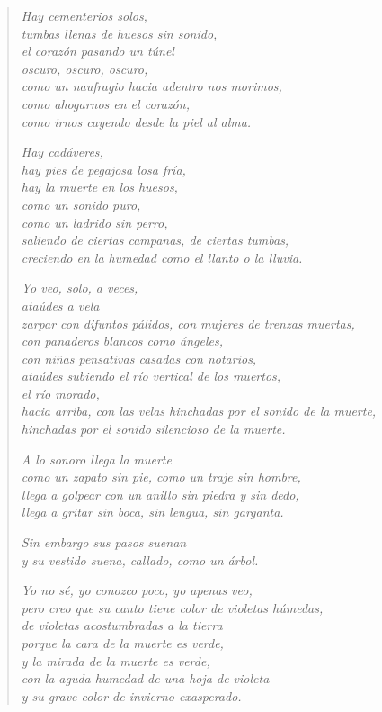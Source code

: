\documentclass[12pt]{article}
\begin{document}
\clearpage
{}
\begin{verse}

\emph{Hay cementerios solos,\\
tumbas llenas de huesos sin sonido,\\
el corazón pasando un túnel\\
oscuro, oscuro, oscuro,\\
como un naufragio hacia adentro nos morimos,\\
como ahogarnos en el corazón,\\
como irnos cayendo desde la piel al alma.}  

\emph{Hay cadáveres,\\
hay pies de pegajosa losa fría,\\
hay la muerte en los huesos,\\
como un sonido puro,\\
como un ladrido sin perro,\\
saliendo de ciertas campanas, de ciertas tumbas,\\
creciendo en la humedad como el llanto o la lluvia.}  

\emph{Yo veo, solo, a veces,\\
ataúdes a vela\\
zarpar con difuntos pálidos, con mujeres de trenzas muertas,\\
con panaderos blancos como ángeles,\\
con niñas pensativas casadas con notarios,\\
ataúdes subiendo el río vertical de los muertos,\\
el río morado,\\
hacia arriba, con las velas hinchadas por el sonido de la muerte,\\
hinchadas por el sonido silencioso de la muerte.}  

\emph{A lo sonoro llega la muerte\\
como un zapato sin pie, como un traje sin hombre,\\
llega a golpear con un anillo sin piedra y sin dedo,\\
llega a gritar sin boca, sin lengua, sin garganta.}  

\emph{Sin embargo sus pasos suenan\\
y su vestido suena, callado, como un árbol.}  

\emph{Yo no sé, yo conozco poco, yo apenas veo,\\
pero creo que su canto tiene color de violetas húmedas,\\
de violetas acostumbradas a la tierra\\
porque la cara de la muerte es verde,\\
y la mirada de la muerte es verde,\\
con la aguda humedad de una hoja de violeta\\
y su grave color de invierno exasperado.}  


\end{verse}
\end{document}
